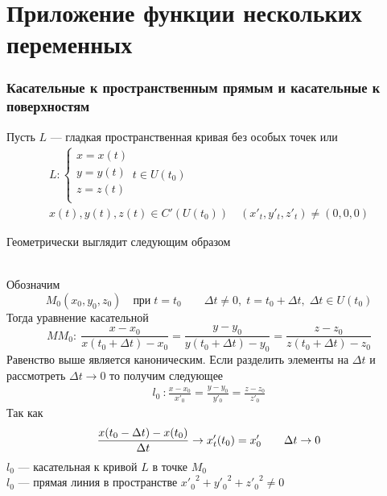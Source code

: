 \author{Andrei Tkachuk}
\part{Приложение функции нескольких переменных}
\section{Касательные к пространственным прямым и касательные к поверхностям}
		\begin{Def}
			Пусть $L$ --- гладкая пространственная кривая без особых точек или
			\begin{gather*}
				L : 
				\begin{cases}
					x = x(t) \\
					y = y(t) \\
					z = z(t) \\
				\end{cases} t \in U(t_0) \\ 
				x(t), y(t), z(t) \in C'(U(t_0)) \quad (x'_t, y'_t, z'_t) \neq (0, 0, 0) 
			\end{gather*}
		\end{Def}   
        Геометрически выглядит следующим образом
        \begin{figure}[bh]
            \noindent{}
        \end{figure}\\
        Обозначим
        \[
            	M_0(x_0, y_0, z_0) \quad \text{при}\; t = t_0 \qquad \Delta t \neq 0, \; t = t_0 + \Delta t, \; \Delta t \in  U(t_0)
        \]
        Тогда уравнение касательной
		\begin{equation*}
            MM_0 :\: \frac{x - x_0}{x (t_0 + \Delta t) - x_0} = \frac{y - y_0}{y (t_0 + \Delta t) - y_0} = \frac{z - z_0}{z (t_0 + \Delta t) - z_0}
		\end{equation*}
		Равенство выше является каноническим. Если разделить элементы на $\Delta t$ и рассмотреть $\Delta t \rightarrow 0$ то получим следующее
		\begin{gather*}
			l_0 \: : \frac{x - x_0}{x'_0} = \frac{y - y_0}{y'_0} = \frac{z - z_0}{z'_0}
        \end{gather*}
        Так как 
        \begin{equation*}
            \frac{x(t_0 - \Delta t) - x(t_0)}{\Delta t} \to x'_t(t_0) = x'_0 \qquad \Delta t \to 0 \\
		\end{equation*}
		$l_0$ --- касательная к кривой $L$ в точке $M_0$ \\
		$l_0$ --- прямая линия в пространстве ${x'_0}^2 + {y'_0}^2 + {z'_0}^2 \neq 0$
		

